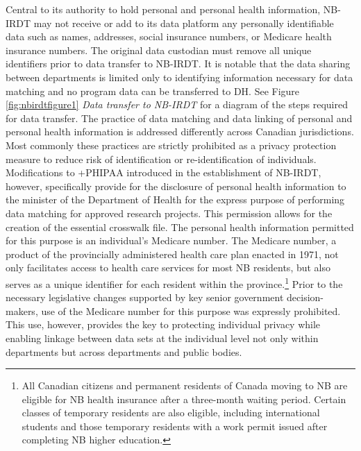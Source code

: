 \documentclass[
]{WileySix}
\begin{document}
Central to its authority to hold personal and personal health information, NB-IRDT may not receive or add to its data platform any personally identifiable data such as names, addresses, social insurance numbers, or Medicare health insurance numbers. The original data custodian must remove all unique identifiers prior to data transfer to NB-IRDT. It is notable that the data sharing between departments is limited only to identifying information necessary for data matching and no program data can be transferred to DH. See Figure \ref{fig:nbirdtfigure1} \emph{Data transfer to NB-IRDT} for a diagram of the steps required for data transfer. The practice of data matching and data linking of personal and personal health information is addressed differently across Canadian jurisdictions. Most commonly these practices are strictly prohibited as a privacy protection measure to reduce risk of identification or re-identification of individuals. Modifications to +PHIPAA\textbar{} introduced in the establishment of NB-IRDT, however, specifically provide for the disclosure of personal health information to the minister of the Department of Health for the express purpose of performing data matching for approved research projects. This permission allows for the creation of the essential crosswalk file. The personal health information permitted for this purpose is an individual's Medicare number. The Medicare number, a product of the provincially administered health care plan enacted in 1971, not only facilitates access to health care services for most NB residents, but also serves as a unique identifier for each resident within the province.\footnote{All Canadian citizens and permanent residents of Canada moving to NB are eligible for NB health insurance after a three-month waiting period. Certain classes of temporary residents are also eligible, including international students and those temporary residents with a work permit issued after completing NB higher education.} Prior to the necessary legislative changes supported by key senior government decision-makers, use of the Medicare number for this purpose was expressly prohibited. This use, however, provides the key to protecting individual privacy while enabling linkage between data sets at the individual level not only within departments but across departments and public bodies.
\end{document}
